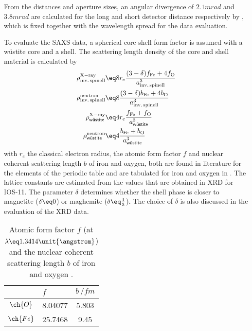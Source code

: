 \documentclass[\main/dresen_thesis.tex]{subfiles}
\begin{document}
    From the distances and aperture sizes, an angular divergence of $2.1 \unit{mrad}$ and $3.8 \unit{mrad}$ are calculated for the long and short detector distance respectively by , which is fixed together with the wavelength spread for the data evaluation.

    To evaluate the SAXS data, a spherical core-shell form factor is assumed with a w\"ustite core and a  shell.
    The scattering length density of the core and shell material is calculated by
    \begin{align}
      \rho^\mathrm{X-ray}_\mathrm{inv.\,spinell}   &\eq   8 r_e \frac{(3-\delta) f_\mathrm{Fe} + 4 f_\mathrm{O}}
                                                                     {a_\mathrm{inv.\,spinell}^3}\\
      \rho^\mathrm{neutron}_\mathrm{inv.\,spinell} &\eq   8 \frac{(3-\delta) b_\mathrm{Fe} + 4 b_\mathrm{O}}
                                                                            {a_\mathrm{inv.\,spinell}^3}\\
      \rho^\mathrm{X-ray}_\textsf{w\"ustite}   &\eq   4 r_e \frac{f_\mathrm{Fe} + f_\mathrm{O}}
                                                                 {a_\textsf{w\"ustite}^3}\\
      \rho^\mathrm{neutron}_\textsf{w\"ustite} &\eq   4 \frac{b_\mathrm{Fe} + b_\mathrm{O}}
                                                             {a_\textsf{w\"ustite}^3}
    \end{align}
    with $r_e$ the classical electron radius, the  atomic form factor $f$ and nuclear coherent scattering length $b$ of iron and oxygen, both are found in literature for the elements of the periodic table and are tabulated for iron and oxygen in .
    The lattice constants are estimated from the values that are obtained in XRD for IOS-11.
    The parameter $\delta$ determines whether the shell phase is closer to magnetite ($\delta \eq 0$) or maghemite ($\delta \eq \tfrac{1}{3}$).
    The choice of $\delta$ is also discussed in the evaluation of the XRD data.
    \begin{table}[ht]
      \centering
      \caption{\label{tab:looselyPackedNS:charMethod:scatteringLenghts}Atomic form factor $f$ (at $\lambda \eq 1.3414 \unit{\angstrom}$) and the nuclear coherent scattering length $b$ of iron and oxygen \cite{Sears_1992_Neutr, BerkeleyLab_1993_asf}.}
      \begin{tabular}{ c | l | c }
                  & $f$       & $b \, / \unit{fm}$ \\
        \hline
        $\ch{O}$  & 8.04077   & 5.803   \\
        $\ch{Fe}$ & 25.7468   & 9.45  \\
        \hline
      \end{tabular}
    \end{table}
\end{document}

